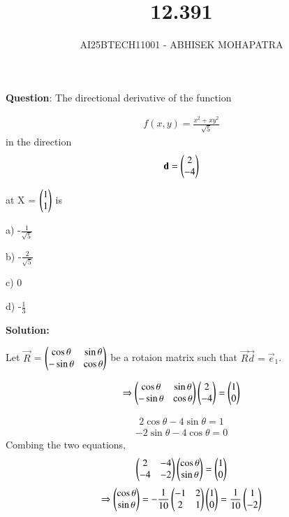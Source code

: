 \documentclass[journal,12pt,onecolumn]{IEEEtran}
\begin{document}
\title{12.391}
\author{AI25BTECH11001 - ABHISEK MOHAPATRA}
{\let\newpage\relax\maketitle}
	
	 	\textbf{Question}:
The directional derivative of the function

\begin{align}
		f(x, y) =\frac{x^2 + xy^2}{\sqrt{5}}
\end{align}
in the direction
\begin{align}
		\mathbf{d} = \begin{pmatrix}2\\-4\end{pmatrix}
\end{align}

at X = $\begin{pmatrix}1\\ 1\end{pmatrix}$ is

a) -$\frac{1}{\sqrt{5}}$

b) -$\frac{2}{\sqrt{5}}$

c) 0

d) -$\frac{1}{3}$

		\textbf{Solution:}

Let $\vec{R}$ = $\begin{pmatrix}\cos{\theta}&\sin{\theta}\\-\sin{\theta}&\cos{\theta}\end{pmatrix}$ be a rotaion matrix such that $\vec{R}\vec{d} = \vec{e}_1$.


\begin{align}
		\Rightarrow\begin{pmatrix}\cos{\theta}&\sin{\theta}\\-\sin{\theta}&\cos{\theta}\end{pmatrix} \begin{pmatrix}2\\-4\end{pmatrix} = \begin{pmatrix}1\\0\end{pmatrix}
\end{align}

\begin{align}
		2\cos{\theta} - 4\sin{\theta} = 1
\end{align}
\begin{align}
		-2\sin{\theta} - 4\cos{\theta} = 0
\end{align}
Combing the two equations,
\begin{align}
		\begin{pmatrix}2 &- 4\\-4&-2\end{pmatrix}\begin{pmatrix}\cos{\theta}\\\sin{\theta}\end{pmatrix} = \begin{pmatrix}1\\0\end{pmatrix}
\end{align}
\begin{align}
	\Rightarrow	\begin{pmatrix}\cos{\theta}\\\sin{\theta}\end{pmatrix} = -\frac{1}{10}\begin{pmatrix}-1&2\\2&1\end{pmatrix}\begin{pmatrix}1\\0\end{pmatrix} = \frac{1}{10}\begin{pmatrix}1\\-2\end{pmatrix}
\end{align}
\end{document}

